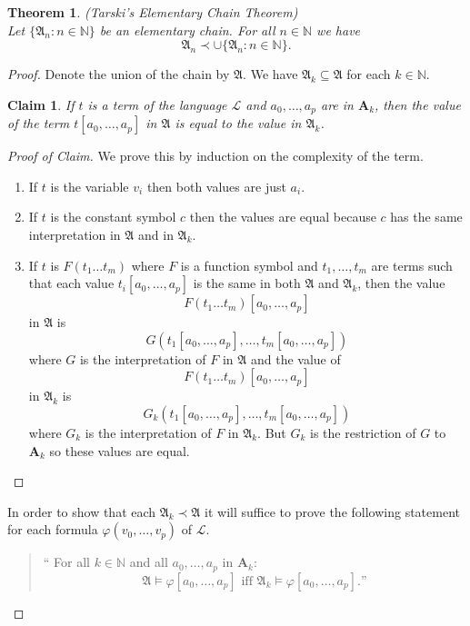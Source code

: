 \documentclass[titlepage, oneside]{amsbook}
\theoremstyle{plain}
\newtheorem{theorem}{Theorem}
\newtheorem*{claim}{Claim}
\theoremstyle{definition}
\theoremstyle{remark}
\newcommand{\lan}{\ensuremath{\mathcal{L}}}
\newcommand{\seq}{\ensuremath{\subseteq}}
\newcommand{\ma}{\ensuremath{\mathfrak{A}}}
\newcommand{\ba}{\ensuremath{\mathbf{A}}}
\newcommand{\nat}{\ensuremath{\mathbb{N}}}
\newcommand{\anot}[2][0]{\ensuremath{ a_{#1} , \dots , a_{#2}}}
\newcommand{\tnot}[2][0]{\ensuremath{ t_{#1} , \dots , t_{#2}}}
\newcommand{\tnt}[2][0]{\ensuremath{ t_{#1}  \dots  t_{#2}}}
\newcommand{\vnot}[2][0]{\ensuremath{ v_{#1} , \dots , v_{#2}}}
\begin{document}
\begin{theorem}\label{T:tec} (Tarski's Elementary Chain Theorem) \\
%
%
Let $\{ \mathfrak{A}_{n} : n \in \nat \}$ be an elementary chain.
For all $n \in \nat$ we have \[\mathfrak{A}_{n} \prec
\cup \{ \mathfrak{A}_{n} :n \in \nat \}.\]

\end{theorem}

\begin{proof}  Denote the union of the chain by $\ma$.  We have $\ma_k
\seq \ma$ for each $k \in \mathbb N$.

\begin{claim}  If $t$ is a term of the language $\lan$ and $\anot p$ are
in $\ba_k$, then the value of the term $t [ \anot p ]$ in $\ma$ is equal
to the value in $\ma_k$.
\end{claim}

\begin{proof}[Proof of  Claim] We prove this by induction on the
complexity of the term.

\begin{enumerate} 
\item  If $t$ is the variable $v_i$ then both values are just
$a_i$.
\item If $t$ is the constant symbol $c$ then the values are equal because
$c$ has the same interpretation in $\ma$ and in $\ma_k$.
\item If $t$ is $F( \tnt[1]{m}) $ where $F$ is a function symbol and
$\tnot[1]{m}$ are terms such that each value $t_i [ \anot p ]$ is the same
in both $\ma$ and $\ma_k $, then the value \[ F( \tnt[1]{m})[\anot p ] \]
in
$\ma$ is \[G(t_1 [ \anot p], \dots , t_m [ \anot p])\] where $G$ is the
interpretation of $F$ in $\ma$ and the value of \[F( \tnt[1]{m}) [\anot
p]\] in $\ma_k$ is \[G_k ( t_1 [\anot p ], \dots , t_m [ \anot p ])\] 
where
$G_k$ is the interpretation of $F$ in $\ma_k$.  But $G_k$ is the
restriction of $G$ to $\ba_k$ so these values are equal.
\end{enumerate}
\renewcommand{\qedsymbol}{}
\end{proof}

In order to show that each $\ma_k \prec \ma$ it will suffice to prove
the following statement  for each formula $\varphi ( \vnot p )$ of
$\lan$. 
 \begin{quote} `` For all $k \in \mathbb N$ and all $\anot p$
in $\ba_k$:  \[ \ma \models \varphi [ \anot p ] \mbox{ iff } \ma_k
\models \varphi [ \anot p ] . \mbox{''} \]
 \end{quote}



\end{proof}
\end{document}
